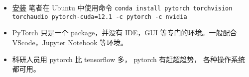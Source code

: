 

\begin{itemize}
\item \href{https://pytorch.org/get-started/locally/}{安装} 笔者在 Ubuntu 中使用命令 \verb|conda install pytorch torchvision torchaudio pytorch-cuda=12.1 -c pytorch -c nvidia|
\item PyTorch 只是一个 package，并没有 IDE，GUI 等专门的环境。一般配合 VScode，Jupyter Notebook 等环境。
\item 科研人员用 pytorch 比 tensorflow 多， pytorch 有赶超趋势， 各种操作系统都可用。
\end{itemize}
